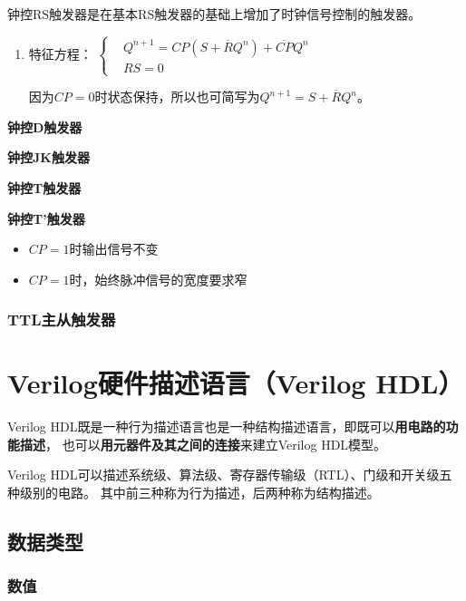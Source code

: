 \documentclass[UTF8,fontset=fandol,zihao=5]{ctexart}
\begin{document}
钟控RS触发器是在基本RS触发器的基础上增加了时钟信号控制的触发器。

\begin{enumerate}
  \item 特征方程：
  $
  \left\{\begin{aligned}
    &Q^{n+1}=CP(S+\overline{R}Q^n)+\overline{CP}Q^n \\
    &RS=0
  \end{aligned}\right.
  $

  因为$CP=0$时状态保持，所以也可简写为$Q^{n+1}=S+\overline{R}Q^n$。
\end{enumerate}

\textbf{钟控D触发器}

\textbf{钟控JK触发器}

\textbf{钟控T触发器}

\textbf{钟控T'触发器}

\begin{methodbox}[钟控电位触发器缺陷]
  \begin{itemize}
    \item $CP=1$时输出信号不变
    \item $CP=1$时，始终脉冲信号的宽度要求窄
  \end{itemize}
\end{methodbox}

\subsubsection{TTL主从触发器}

\section{Verilog硬件描述语言（Verilog HDL）}

Verilog HDL既是一种行为描述语言也是一种结构描述语言，即既可以\textbf{用电路的功能描述}，
也可以\textbf{用元器件及其之间的连接}来建立Verilog HDL模型。

Verilog HDL可以描述系统级、算法级、寄存器传输级（RTL）、门级和开关级五种级别的电路。
其中前三种称为行为描述，后两种称为结构描述。

\subsection{数据类型}

\subsubsection{数值}
\end{document}
